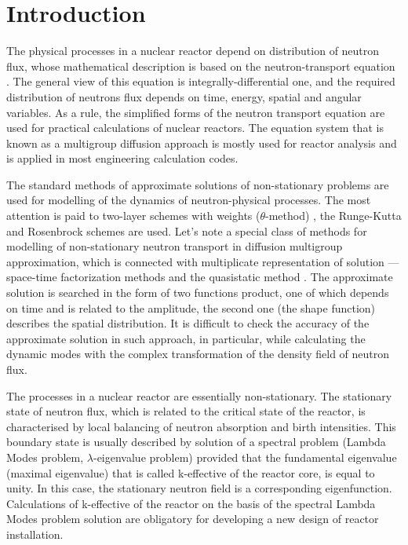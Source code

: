 \documentclass[authoryear]{elsarticle}
\begin{document}
\section{Introduction} 
The physical processes in a nuclear reactor \cite{duderstadt1976nuclear}
depend on distribution of neutron flux, whose mathematical description is based on the neutron-transport equation
\cite{hetrick1971dynamics,stacey}. 
The general view of this equation is integrally-differential one, and the required distribution of neutrons flux depends on time, energy, spatial and angular variables. As a rule, the simplified forms of the neutron transport equation are used for practical calculations of nuclear reactors. The equation system that is known as a multigroup diffusion approach is mostly used for reactor analysis
\cite{marchuk1986numerical,lewis1993computational,sutton1996diffusion,cho2005fundamentals}
and is applied in most engineering calculation codes.

The standard methods of approximate solutions of non-stationary problems are used for modelling of the dynamics of neutron-physical processes. The most attention is paid to two-layer schemes with weights ($\theta$-method)
\cite{Ascher2008,LeVeque2007,HundsdorferVerwer2003},
the Runge-Kutta and Rosenbrock schemes 
\cite{Butcher2008,HairerWanner2010} are used.
Let’s note a special class of methods for modelling of non-stationary neutron transport in diffusion multigroup approximation, which is connected with multiplicate representation of solution --- space-time factorization methods and the quasistatic method
\cite{chou1990three,dahmani20013d,dodds1976accuracy,goluoglu2001time}.
The approximate solution is searched in the form of two functions product, one of which depends on time and is related to the amplitude, the second one (the shape function) describes the spatial distribution. It is difficult to check the accuracy of the approximate solution in such approach, in particular, while calculating the dynamic modes with the complex transformation of the density field of neutron flux.

The processes in a nuclear reactor are essentially non-stationary. The stationary state of neutron flux, which is related to the critical state of the reactor, is characterised by local balancing of neutron absorption and birth intensities. This boundary state is usually described by solution of a spectral problem (Lambda Modes problem, $\lambda$-eigenvalue problem) provided that the fundamental eigenvalue (maximal eigenvalue) that is called k-effective of the reactor core, is equal to unity. In this case, the stationary neutron field is a corresponding eigenfunction. Calculations of k-effective of the reactor on the basis of the spectral Lambda Modes problem solution are obligatory for developing a new design of reactor installation.
\end{document}
